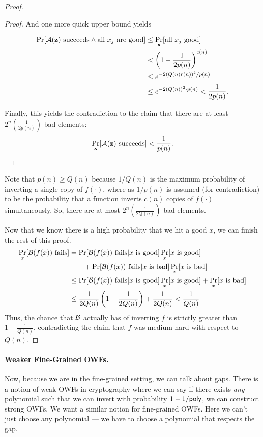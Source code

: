 \begin{proof}
\begin{proof}
		
		And one more quick upper bound yields
		
		\begin{align*}
	\Pr[\mathcal{A}(\mathbf z) \mbox{ succeeds} \land \mbox{all } x_j \mbox{ are good}] &\le \Pr_{\mathbf x}[\mbox{all $x_j$ good}]\\
	&< \left(1 - \frac{1}{2p(n)}\right)^{c(n)}\\
	&\leq e^{-2\left(Q(n)r(n)\right)^2 / p(n)}\\
	&\leq e^{- 2\left(Q(n)\right)^2 \cdot p(n)} < \frac 1 {2p(n)}.
		\end{align*}
		
		Finally, this yields the contradiction to the claim that there are at least $2^n(\frac{1}{2p(n)})$ bad elements:
		\begin{align*}
		\Pr_{\mathbf x}[\mathcal{A}(\mathbf z) \mbox{ succeeds}] < \frac{1}{p(n)}.
		\end{align*}
	\end{proof}

	Note that $p(n)\geq Q(n)$ because $1/Q(n)$ is the maximum probability of inverting a single copy of $f(\cdot)$, where as $1/p(n)$ is assumed (for contradiction) to be the probability that a function inverts $c(n)$ copies of $f(\cdot)$ simultaneously. So, there are at most $2^n(\frac{1}{2Q(n)})$ bad elements.

	Now that we know there is a high probability that we hit a good $x$, we can finish the rest of this proof.
	\begin{align*}
	\Pr_{x}[{\cal B}(f(x)) \mbox{ fails}] &= \Pr[{\cal B}(f(x)) \mbox{ fails} | x \mbox{ is good}] \Pr_x[x \mbox{ is good}]\\
	&\qquad + \Pr[{\cal B}(f(x)) \mbox{ fails} | x \mbox{ is bad}] \Pr_x[x \mbox{ is bad}]\\
	&\le\Pr[{\cal B}(f(x)) \mbox{ fails} | x \mbox{ is good}] \Pr_x[x \mbox{ is good}] + \Pr_x[x \mbox{ is bad}]\\
	&\le \frac{1}{2Q(n)}\left(1 - \frac 1 {2Q(n)}\right) + \frac{1}{2Q(n)} < \frac 1 {Q(n)}
	\end{align*}
	Thus, the chance that ${\cal B}$ actually has of inverting $f$ is strictly greater than $1 - \frac 1 {Q(n)}$, contradicting the claim that $f$ was medium-hard with respect to $Q(n)$.
\end{proof}

\paragraph{Weaker Fine-Grained OWFs.} Now, because we are in the fine-grained setting, we can talk about gaps. There is a notion of weak-OWFs in cryptography where we can say if there exists \emph{any} polynomial such that we can invert with probability $1 - 1/\mathsf{poly}$, we can construct strong OWFs. We want a similar notion for fine-grained OWFs. Here we can't just choose any polynomial --- we have to choose a polynomial that respects the gap.

